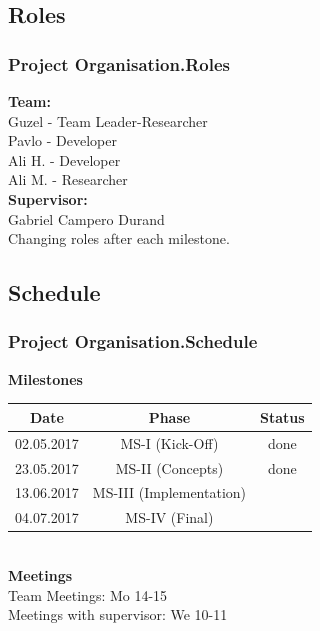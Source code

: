 \documentclass{beamer}
\begin{document}
\subsection{Roles}
\begin{frame}
\frametitle{Project Organisation.Roles}
\textbf{Team:} \\
\hspace{0.3 cm}Guzel - Team Leader-Researcher\\
\hspace{0.3 cm}Pavlo - Developer\\
\hspace{0.3 cm}Ali H. - Developer\\
\hspace{0.3 cm}Ali M. - Researcher\\
\vspace{0.2 cm}
\textbf{Supervisor:} \\
\hspace{0.3 cm} Gabriel Campero Durand \\
\vspace{0.2 cm}
Changing roles after each milestone.
\end{frame}

\subsection{Schedule}
\begin{frame}
\frametitle{Project Organisation.Schedule}
\textbf{Milestones} \\
\vspace{0.5 cm}
\begin{tabular}{|c|c|c|}
\hline
Date & Phase & Status\\
\hline 
02.05.2017 & MS-I (Kick-Off) & done\\ 
\hline 
23.05.2017 & MS-II (Concepts) & done\\ 
\hline 
13.06.2017 & MS-III (Implementation) & \\ 
\hline 
04.07.2017 & MS-IV (Final) & \\ 
\hline 
\end{tabular}
\\ \vspace{0.5 cm}
\textbf{Meetings} \\ 
\vspace{0.5 cm}
\hspace{0.5 cm} Team Meetings: Mo 14-15 \\
\hspace{0.5 cm} Meetings with supervisor: We 10-11

\end{frame}
\end{document}
